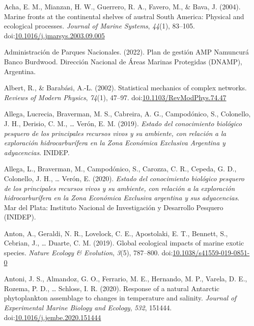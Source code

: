 \documentclass[
]{article}
\newlength{\cslhangindent}
\newenvironment{CSLReferences}[2] %
 {\begin{list}{}{%
  \setlength{\itemindent}{0pt}
  \setlength{\leftmargin}{0pt}
  \setlength{\parsep}{0pt}
  \ifodd #1
   \setlength{\leftmargin}{\cslhangindent}
   \setlength{\itemindent}{-1\cslhangindent}
  \fi
  \setlength{\itemsep}{#2\baselineskip}}}
 {\end{list}}
\begin{document}
\label{refs}
\begin{CSLReferences}{1}{0}
Acha, E. M., Mianzan, H. W., Guerrero, R. A., Favero, M., \& Bava, J.
(2004). Marine fronts at the continental shelves of austral {South
America}: {Physical} and ecological processes. \emph{Journal of Marine
Systems}, \emph{44}(1), 83--105.
doi:\href{https://doi.org/10.1016/j.jmarsys.2003.09.005}{10.1016/j.jmarsys.2003.09.005}

Administración de Parques Nacionales. (2022). {Plan de gestión AMP
Namuncurá Banco Burdwood}. {Dirección Nacional de Áreas Marinas
Protegidas (DNAMP), Argentina}.

Albert, R., \& Barabási, A.-L. (2002). Statistical mechanics of complex
networks. \emph{Reviews of Modern Physics}, \emph{74}(1), 47--97.
doi:\href{https://doi.org/10.1103/RevModPhys.74.47}{10.1103/RevModPhys.74.47}

Allega, Lucrecia, Braverman, M. S., Cabreira, A. G., Campodónico, S.,
Colonello, J. H., Derisio, C. M., \ldots{} Verón, E. M. (2019).
\emph{{Estado del conocimiento biológico pesquero de los principales
recursos vivos y su ambiente, con relación a la exploración
hidrocarburífera en la Zona Económica Exclusiva Argentina y
adyacencias}}. {INIDEP}.

Allega, L., Braverman, M., Campodónico, S., Carozza, C. R., Cepeda, G.
D., Colonello, J. H., \ldots{} Verón, E. (2020). \emph{{Estado del
conocimiento biológico pesquero de los principales recursos vivos y su
ambiente, con relación a la exploración hidrocarburífera en la Zona
Económica Exclusiva argentina y sus adyacencias}}. {Mar del Plata}:
{Instituto Nacional de Investigación y Desarrollo Pesquero (INIDEP)}.

Anton, A., Geraldi, N. R., Lovelock, C. E., Apostolaki, E. T., Bennett,
S., Cebrian, J., \ldots{} Duarte, C. M. (2019). Global ecological
impacts of marine exotic species. \emph{Nature Ecology \& Evolution},
\emph{3}(5), 787--800.
doi:\href{https://doi.org/10.1038/s41559-019-0851-0}{10.1038/s41559-019-0851-0}

Antoni, J. S., Almandoz, G. O., Ferrario, M. E., Hernando, M. P.,
Varela, D. E., Rozema, P. D., \ldots{} Schloss, I. R. (2020). Response
of a natural {Antarctic} phytoplankton assemblage to changes in
temperature and salinity. \emph{Journal of Experimental Marine Biology
and Ecology}, \emph{532}, 151444.
doi:\href{https://doi.org/10.1016/j.jembe.2020.151444}{10.1016/j.jembe.2020.151444}


\end{CSLReferences}
\end{document}
